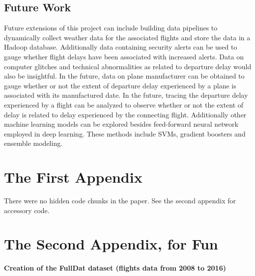 \documentclass[12pt,twoside]{amherstthesis}
\begin{document}
  \section{Future Work}\label{future-work}
  
  Future extensions of this project can include building data pipelines to
  dynamically collect weather data for the associated flights and store
  the data in a Hadoop database. Additionally data containing security
  alerts can be used to gauge whether flight delays have been associated
  with increased alerts. Data on computer glitches and technical
  abnormalities as related to departure delay would also be insightful. In
  the future, data on plane manufacturer can be obtained to gauge whether
  or not the extent of departure delay experienced by a plane is
  associated with its manufactured date. In the future, tracing the
  departure delay experienced by a flight can be analyzed to observe
  whether or not the extent of delay is related to delay experienced by
  the connecting flight. Additionally other machine learning models can be
  explored besides feed-forward neural network employed in deep learning.
  These methods include SVMs, gradient boosters and ensemble modeling.
  
  \appendix
  
  \chapter{The First Appendix}\label{the-first-appendix}
  
  There were no hidden code chunks in the paper. See the second appendix
  for accessory code.
  
  \chapter{The Second Appendix, for
  Fun}\label{the-second-appendix-for-fun}
  
  \subsubsection{Creation of the FullDat dataset (flights data from 2008
  to
  2016)}\label{creation-of-the-fulldat-dataset-flights-data-from-2008-to-2016}
  
\end{document}
